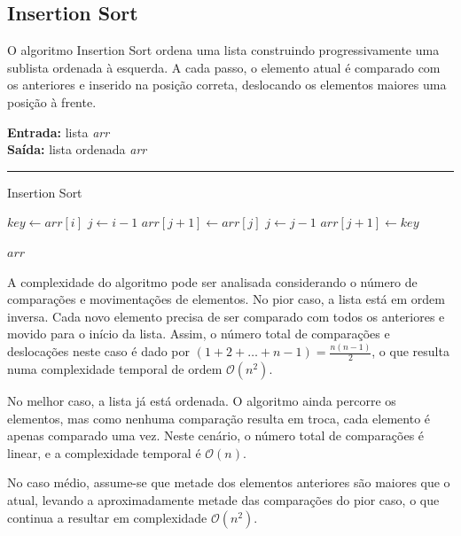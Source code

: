 \documentclass[conference]{IEEEtran}
\begin{document}
\subsection{Insertion Sort}

O algoritmo Insertion Sort ordena uma lista construindo progressivamente uma sublista ordenada à esquerda. A cada passo, o elemento atual é comparado com os anteriores e inserido na posição correta, deslocando os elementos maiores uma posição à frente.

\begin{algorithm}[H]
    \raggedright
    \vspace{.1em}
    \textbf{Entrada:} lista \textit{arr} \\
    \textbf{Saída:} lista ordenada \textit{arr} \\
    \vspace{.5em}
    \hrule 
    \caption{Insertion Sort}
    \begin{algorithmic}[1]
            \State $key \gets arr[i]$
            \State $j \gets i - 1$
                \State $arr[j + 1] \gets arr[j]$
                \State $j \gets j - 1$
            \EndWhile
            \State $arr[j + 1] \gets key$
        \EndFor
    
        \State \Return $arr$
    \end{algorithmic}
\end{algorithm}

A complexidade do algoritmo pode ser analisada considerando o número de comparações e movimentações de elementos. No pior caso, a lista está em ordem inversa. Cada novo elemento precisa de ser comparado com todos os anteriores e movido para o início da lista. Assim, o número total de comparações e deslocações neste caso é dado por \((1 + 2 + \ldots + n-1) = \frac{n(n-1)}{2}\), o que resulta numa complexidade temporal de ordem \(\mathcal{O}(n^2)\).

No melhor caso, a lista já está ordenada. O algoritmo ainda percorre os elementos, mas como nenhuma comparação resulta em troca, cada elemento é apenas comparado uma vez. Neste cenário, o número total de comparações é linear, e a complexidade temporal é \(\mathcal{O}(n)\).

No caso médio, assume-se que metade dos elementos anteriores são maiores que o atual, levando a aproximadamente metade das comparações do pior caso, o que continua a resultar em complexidade \(\mathcal{O}(n^2)\).
\end{document}
